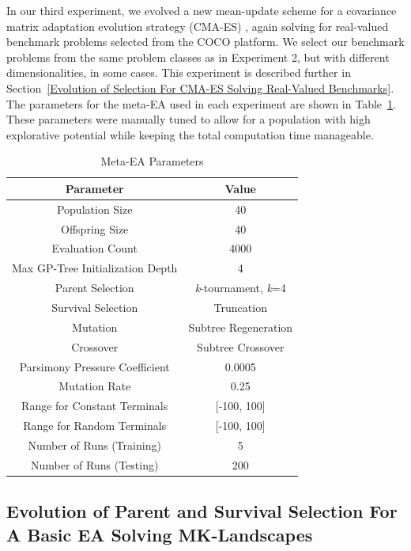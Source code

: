 \documentclass[sigconf]{acmart}
\begin{document}
In our third experiment, we evolved a new mean-update scheme for a covariance matrix adaptation evolution strategy (CMA-ES) \citep{hansen1996cmaes}, again solving for real-valued benchmark problems selected from the COCO platform. We select our benchmark problems from the same problem classes as in Experiment 2, but with different dimensionalities, in some cases. This experiment is described further in Section~\ref{Evolution of Selection For CMA-ES Solving Real-Valued Benchmarks}.
The parameters for the meta-EA used in each experiment are shown in Table~\ref{tab:Meta-EA Parameters}. These parameters were manually tuned to allow for a population with high explorative potential while keeping the total computation time manageable.

\begin{table}
	\centering
	\caption{Meta-EA Parameters}
	\label{tab:Meta-EA Parameters}
	\begin{tabular}{c|c}
		\toprule
		Parameter& Value\\
		\midrule
		Population Size & 40 \\
		\hline
		Offspring Size & 40\\
		\hline
		Evaluation Count & 4000\\
		\hline
		Max GP-Tree Initialization Depth & 4\\
		\hline
		Parent Selection & \textit{k}-tournament, \textit{k}=4 \\
		\hline
		Survival Selection & Truncation\\
		\hline
		Mutation & Subtree Regeneration\\
		\hline
		Crossover & Subtree Crossover\\
		\hline
		Parsimony Pressure Coefficient & 0.0005\\
		\hline
		Mutation Rate & 0.25\\
		\hline
		Range for Constant Terminals & [-100, 100]\\
		\hline
		Range for Random Terminals & [-100, 100]\\
		\hline
		Number of Runs (Training) & 5 \\
		\hline
		Number of Runs (Testing) & 200\\
		
		\bottomrule
	\end{tabular}
\end{table}

\subsection{Evolution of Parent and Survival Selection For A Basic EA Solving MK-Landscapes}
\label{Evolution of Parent and Survival Selection For A Basic EA Solving MK-Landscapes}
\end{document}

